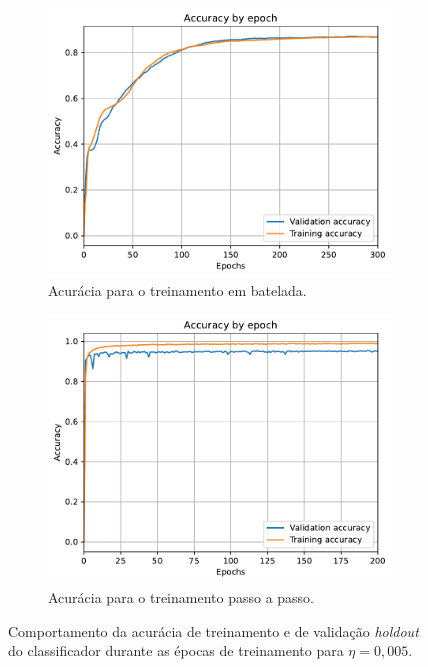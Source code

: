 \begin{figure}[H]
	\centering
	\begin{subfigure}{0.49\textwidth}
		\includegraphics[width=\linewidth]{img/0-005/Accuracy_by_epoch-Batch-300}
		\caption{Acurácia para o treinamento em batelada.}
		\label{fig:Accuracy_by_epoch-batch-300}
	\end{subfigure}
	\begin{subfigure}{0.49\textwidth}
		\includegraphics[width=\linewidth]{img/0-005/Accuracy_by_epoch-Step-200}
		\caption{Acurácia para o treinamento passo a passo.}
		\label{fig:Accuracy_by_epoch-Step-200}
	\end{subfigure}
	\caption{Comportamento da acurácia de treinamento e de validação \textit{holdout} do classificador durante as épocas de treinamento para $\eta = 0,005$. }
\end{figure}


